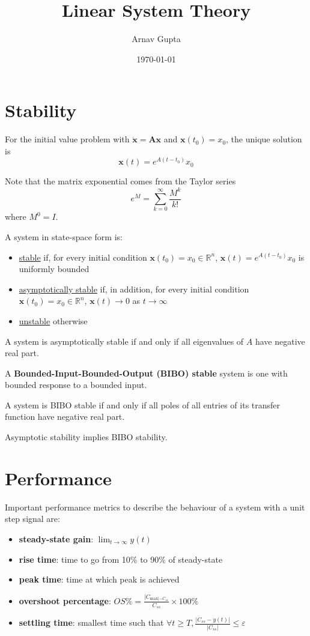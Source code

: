 \documentclass[11pt]{article}
\author{Arnav Gupta}
\date{\today}
\title{Linear System Theory}
\begin{document}
\maketitle
\tableofcontents

\section{Stability}
\label{sec:org985bd11}
For the initial value problem with \(\dot{\mathbf{x}} = \mathbf{Ax}\) and
\(\mathbf{x}(t_{0}) = x_{0}\),
the unique solution is
$$
\mathbf{x}(t) = e^{A(t-t_{0})} x_{0}
$$

Note that the matrix exponential comes from the Taylor series
$$
e^{M} = \sum_{k = 0}^{\infty} \frac{M^{k}}{k!}
$$
where \(M^{0} = I\).

A system in state-space form is:
\begin{itemize}
\item \uline{stable} if, for every initial condition \(\mathbf{x}(t_{0}) = x_{0} \in \mathbb{R}^{n}\),
\(\mathbf{x}(t) = e^{A(t - t_{0})} x_{0}\) is uniformly bounded
\item \uline{asymptotically stable} if, in addition, for every initial condition \(\mathbf{x}(t_{0}) = x_{0} \in \mathbb{R}^{n}\),
\(\mathbf{x}(t) \to 0\) as \(t \to \infty\)
\item \uline{unstable} otherwise
\end{itemize}

A system is asymptotically stable if and only if all eigenvalues of \(A\) have negative real part.

A \textbf{Bounded-Input-Bounded-Output (BIBO) stable} system is one with bounded response to a bounded input.

A system is BIBO stable if and only if all poles of all entries of its transfer function have negative real
part.

Asymptotic stability implies BIBO stability.
\section{Performance}
\label{sec:org8a0071d}
Important performance metrics to describe the behaviour of a system with a unit step signal are:
\begin{itemize}
\item \textbf{steady-state gain}: \(\lim_{t \to \infty} y(t)\)
\item \textbf{rise time}: time to go from 10\% to 90\% of steady-state
\item \textbf{peak time}: time at which peak is achieved
\item \textbf{overshoot percentage}: \(OS\% = \frac{|C_{\text{max}| - C_{ss}}}{C_{ss}} \times 100 \%\)
\item \textbf{settling time}: smallest time such that \(\forall t \ge T, \frac{|C_{ss}-y(t)|}{|C_{ss}|} \le \varepsilon\)
\end{itemize}
\end{document}
